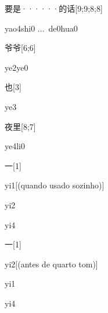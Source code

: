 \begin{verbete}{要是······的话}[9;9;8;8]
\begin{pronuncia}[\\]{yao4shi0 ...\  de0hua0}
\end{pronuncia}
\end{verbete}

\begin{verbete}[ye2ye0]{爷爷}[6;6]
\begin{pronuncia}{ye2ye0}
\end{pronuncia}
\end{verbete}

\begin{verbete}[ye3]{也}[3]
\begin{pronuncia}{ye3}
\end{pronuncia}
\end{verbete}

\begin{verbete}[ye4li0]{夜里}[8;7]
\begin{pronuncia}{ye4li0}
\end{pronuncia}
\end{verbete}

\begin{verbete}[yi1]{一}[1]
\begin{pronuncia}[\\]{yi1}[(quando usado sozinho)]
\end{pronuncia}
\begin{pronuncia}{yi2}
\end{pronuncia}
\begin{pronuncia}{yi4}
\end{pronuncia}
\end{verbete}

\begin{verbete}[yi2]{一}[1]
\begin{pronuncia}[\\]{yi2}[(antes de quarto tom)]
\end{pronuncia}
\begin{pronuncia}{yi1}
\end{pronuncia}
\begin{pronuncia}{yi4}
\end{pronuncia}
\end{verbete}

